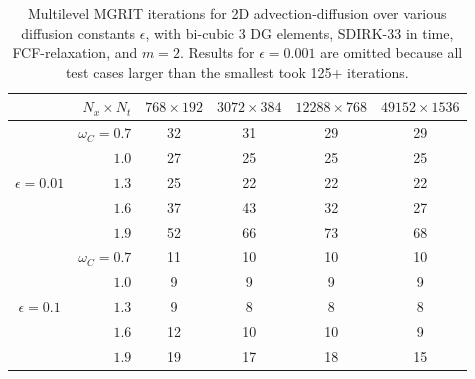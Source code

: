\documentclass[VANCOUVER,STIX1COL]{WileyNJD-v2}
\begin{document}
\begin{table}[h!]
\centering
\begin{tabular}{c r|c|c|c|c}
    
     & $N_x \times N_t$ & $768 \times 192$ & $3072 \times 384$ & $12288 \times 768$ & $49152 \times 1536$ \\  \toprule
     \multirow{5}{*}{$\epsilon=0.01$} & $\omega_C=0.7$   & 32 & 31 & 29 & 29 \\ 
     & $1.0$           & 27 & 25 & 25 & 25 \\ 
     &$1.3$            & 25 & 22 & 22 & 22 \\ 
     &$1.6$            & 37 & 43 & 32 & 27 \\  
     &$1.9$            & 52 & 66 & 73 & 68 \\   \midrule
     \multirow{5}{*}{$\epsilon=0.1$} & $\omega_C=0.7$   & 11  & 10  & 10  & 10 \\ 
     &$1.0$            & 9  & 9  & 9  & 9 \\ 
     &$1.3$            & 9  & 8  & 8  & 8 \\ 
     &$1.6$            & 12 & 10 & 10 & 9 \\ 
     &$1.9$            & 19 & 17 & 18 & 15 \\  \bottomrule
\end{tabular}
\caption{Multilevel MGRIT iterations for 2D advection-diffusion over various diffusion constants $\epsilon$, with bi-cubic 3 DG elements, SDIRK-33 in time, FCF-relaxation, and $m=2$. Results for $\epsilon=0.001$ are omitted because all test cases larger than the smallest took 125+ iterations. }
\label{tab:order3_CD}
\end{table}
\end{document}
